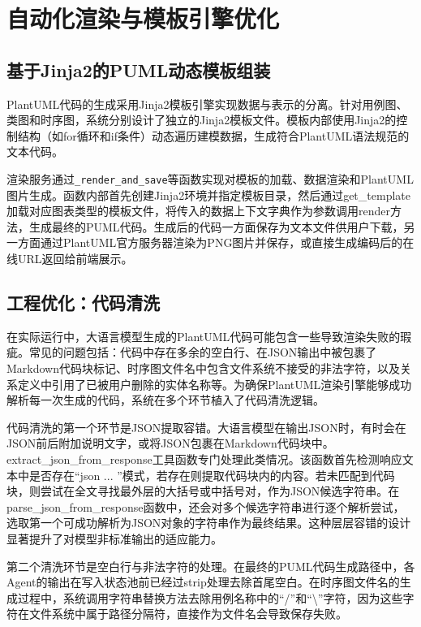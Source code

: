\section{自动化渲染与模板引擎优化}

\subsection{基于Jinja2的PUML动态模板组装}

PlantUML代码的生成采用Jinja2模板引擎实现数据与表示的分离。针对用例图、类图和时序图，系统分别设计了独立的Jinja2模板文件。模板内部使用Jinja2的控制结构（如for循环和if条件）动态遍历建模数据，生成符合PlantUML语法规范的文本代码。

渲染服务通过\texttt{\_render\_and\_save}等函数实现对模板的加载、数据渲染和PlantUML图片生成。函数内部首先创建Jinja2环境并指定模板目录，然后通过get\_template加载对应图表类型的模板文件，将传入的数据上下文字典作为参数调用render方法，生成最终的PUML代码。生成后的代码一方面保存为文本文件供用户下载，另一方面通过PlantUML官方服务器渲染为PNG图片并保存，或直接生成编码后的在线URL返回给前端展示。

\subsection{工程优化：代码清洗}

在实际运行中，大语言模型生成的PlantUML代码可能包含一些导致渲染失败的瑕疵。常见的问题包括：代码中存在多余的空白行、在JSON输出中被包裹了Markdown代码块标记、时序图文件名中包含文件系统不接受的非法字符，以及关系定义中引用了已被用户删除的实体名称等。为确保PlantUML渲染引擎能够成功解析每一次生成的代码，系统在多个环节植入了代码清洗逻辑。

代码清洗的第一个环节是JSON提取容错。大语言模型在输出JSON时，有时会在JSON前后附加说明文字，或将JSON包裹在Markdown代码块中。extract\_json\_from\_response工具函数专门处理此类情况。该函数首先检测响应文本中是否存在“\textasciigrave\textasciigrave\textasciigrave json ... \textasciigrave\textasciigrave\textasciigrave”模式，若存在则提取代码块内的内容。若未匹配到代码块，则尝试在全文寻找最外层的大括号或中括号对，作为JSON候选字符串。在parse\_json\_from\_response函数中，还会对多个候选字符串进行逐个解析尝试，选取第一个可成功解析为JSON对象的字符串作为最终结果。这种层层容错的设计显著提升了对模型非标准输出的适应能力。

第二个清洗环节是空白行与非法字符的处理。在最终的PUML代码生成路径中，各Agent的输出在写入状态池前已经过strip处理去除首尾空白。在时序图文件名的生成过程中，系统调用字符串替换方法去除用例名称中的“/”和“\textbackslash”字符，因为这些字符在文件系统中属于路径分隔符，直接作为文件名会导致保存失败。

